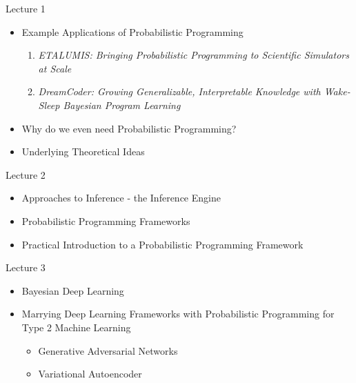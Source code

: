 \documentclass[AERbeamer%
              ,optEnglish%
              ,optBiber%
              ,optBibstyleAlphabetic%
              ,optBeamerClassicFormat%
              ]{AERlatex}%
\begin{document}
\begin{frame}[c]{Lecture 1}
    \centering
    \begin{itemize}
        \item Example Applications of Probabilistic Programming
        \begin{enumerate}
            \item \textit{ETALUMIS: Bringing Probabilistic Programming to Scientific Simulators at Scale}
            \item \textit{DreamCoder: Growing Generalizable, Interpretable Knowledge with Wake-Sleep Bayesian Program Learning}
        \end{enumerate}
        \item Why do we even need Probabilistic Programming?
        \item Underlying Theoretical Ideas
    \end{itemize}
\end{frame}


\begin{frame}[c]{Lecture 2}
    \centering
    \begin{itemize}
        \item Approaches to Inference - the Inference Engine
        \item Probabilistic Programming Frameworks
        \item Practical Introduction to a Probabilistic Programming Framework
    \end{itemize}
\end{frame}


\begin{frame}[c]{Lecture 3}
    \centering
    \begin{itemize}
        \item Bayesian Deep Learning
        \item Marrying Deep Learning Frameworks with Probabilistic Programming for Type 2 Machine Learning
        \begin{itemize}
            \item Generative Adversarial Networks
            \item Variational Autoencoder
        \end{itemize}
    \end{itemize}
\end{frame}
\end{document}
